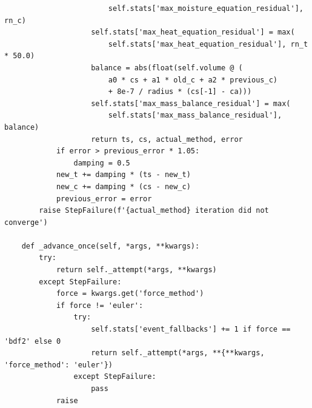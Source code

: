 \begin{verbatim}
                        self.stats['max_moisture_equation_residual'], rn_c)
                    self.stats['max_heat_equation_residual'] = max(
                        self.stats['max_heat_equation_residual'], rn_t * 50.0)
                    balance = abs(float(self.volume @ (
                        a0 * cs + a1 * old_c + a2 * previous_c)
                        + 8e-7 / radius * (cs[-1] - ca)))
                    self.stats['max_mass_balance_residual'] = max(
                        self.stats['max_mass_balance_residual'], balance)
                    return ts, cs, actual_method, error
            if error > previous_error * 1.05:
                damping = 0.5
            new_t += damping * (ts - new_t)
            new_c += damping * (cs - new_c)
            previous_error = error
        raise StepFailure(f'{actual_method} iteration did not converge')

    def _advance_once(self, *args, **kwargs):
        try:
            return self._attempt(*args, **kwargs)
        except StepFailure:
            force = kwargs.get('force_method')
            if force != 'euler':
                try:
                    self.stats['event_fallbacks'] += 1 if force == 'bdf2' else 0
                    return self._attempt(*args, **{**kwargs, 'force_method': 'euler'})
                except StepFailure:
                    pass
            raise


\end{verbatim}
